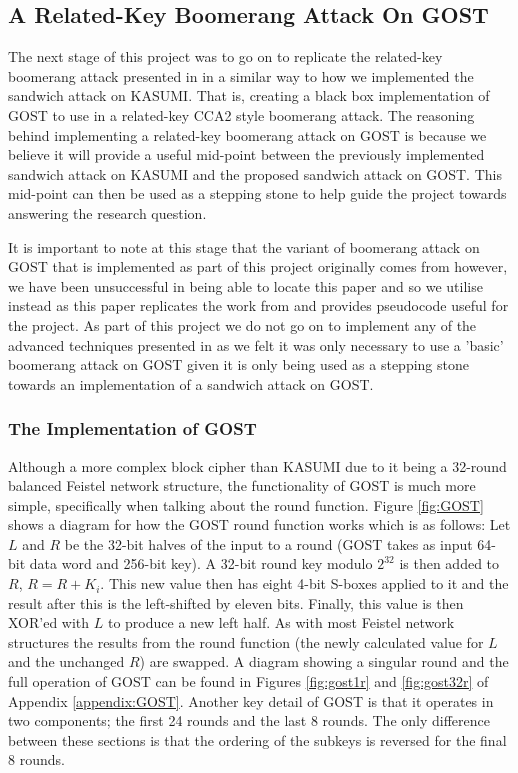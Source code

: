 \documentclass[10pt,journal,compsoc]{IEEEtran}
\begin{document}
\subsection{A Related-Key Boomerang Attack On GOST}
The next stage of this project was to go on to replicate the related-key boomerang attack presented in \cite{cryptoeprint:2010/111} in a similar way to how we implemented the sandwich attack on KASUMI. That is, creating a black box implementation of GOST to use in a related-key CCA2 style boomerang attack. The reasoning behind implementing a related-key boomerang attack on GOST is because we believe it will provide a useful mid-point between the previously implemented sandwich attack on KASUMI and the proposed sandwich attack on GOST. This mid-point can then be used as a stepping stone to help guide the project towards answering the research question.

It is important to note at this stage that the variant of boomerang attack on GOST that is implemented as part of this project originally comes from \cite{unfindable} however, we have been unsuccessful in being able to locate this paper and so we utilise \cite{cryptoeprint:2010/111} instead as this paper replicates the work from \cite{unfindable} and provides pseudocode useful for the project. As part of this project we do not go on to implement any of the advanced techniques presented in \cite{cryptoeprint:2010/111} as we felt it was only necessary to use a 'basic' boomerang attack on GOST given it is only being used as a stepping stone towards an implementation of a sandwich attack on GOST.

\subsubsection{The Implementation of GOST}
Although a more complex block cipher than KASUMI due to it being a 32-round balanced Feistel network structure, the functionality of GOST is much more simple, specifically when talking about the round function. Figure \ref{fig:GOST} shows a diagram for how the GOST round function works which is as follows: Let \(L\) and \(R\) be the 32-bit halves of the input to a round (GOST takes as input 64-bit data word and 256-bit key). A 32-bit round key modulo \(2^{32}\) is then added to \(R\), \(R = R + K_i\). This new value then has eight 4-bit S-boxes applied to it and the result after this is the left-shifted by eleven bits. Finally, this value is then XOR'ed with \(L\) to produce a new left half. As with most Feistel network structures the results from the round function (the newly calculated value for \(L\) and the unchanged \(R\)) are swapped. A diagram showing a singular round and the full operation of GOST can be found in Figures \ref{fig:gost1r} and \ref{fig:gost32r} of Appendix \ref{appendix:GOST}. Another key detail of GOST is that it operates in two components; the first 24 rounds and the last 8 rounds. The only difference between these sections is that the ordering of the subkeys is reversed for the final 8 rounds.
\end{document}
